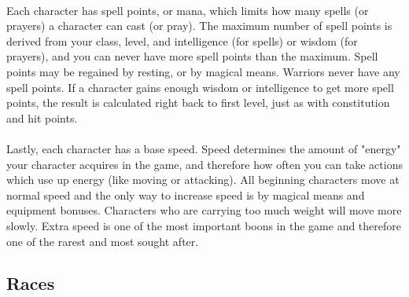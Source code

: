 \paragraph{}
Each character has spell points, or mana, which limits how many spells
(or prayers) a character can cast (or pray). The maximum number of
spell points is derived from your class, level, and intelligence (for
spells) or wisdom (for prayers), and you can never have more spell
points than the maximum. Spell points may be regained by resting, or by
magical means. Warriors never have any spell points. If a character
gains enough wisdom or intelligence to get more spell points, the result
is calculated right back to first level, just as with constitution and
hit points.

\paragraph{}
Lastly, each character has a base speed. Speed determines the amount of
"energy" your character acquires in the game, and therefore how often
you can take actions which use up energy (like moving or attacking).
All beginning characters move at normal speed and the only way to
increase speed is by magical means and equipment bonuses. Characters
who are carrying too much weight will move more slowly. Extra speed is
one of the most important boons in the game and therefore one of the
rarest and most sought after.

\subsection{Races}
